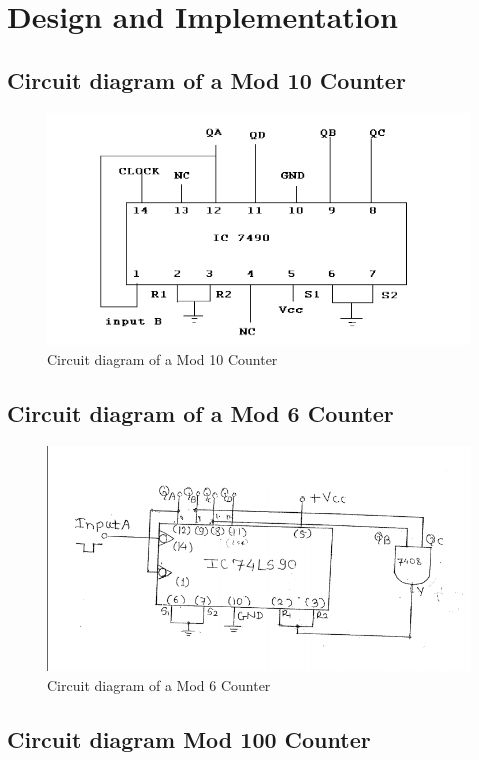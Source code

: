 \documentclass[11pt]{article}
\begin{document}
\section{Design and Implementation}

\subsection{Circuit diagram of a Mod 10 Counter}
\begin{figure}[H]
	\centering
	\includegraphics[scale = 0.5]{mod 10.png}
	\caption{Circuit diagram of a Mod 10 Counter}
\end{figure}

\subsection{Circuit diagram of a Mod 6 Counter}
\begin{figure}[H]
	\centering
	\includegraphics[scale = 0.5]{mod 6.png}
	\caption{Circuit diagram of a Mod 6 Counter}
\end{figure}

\subsection{Circuit diagram Mod 100 Counter}
\end{document}
